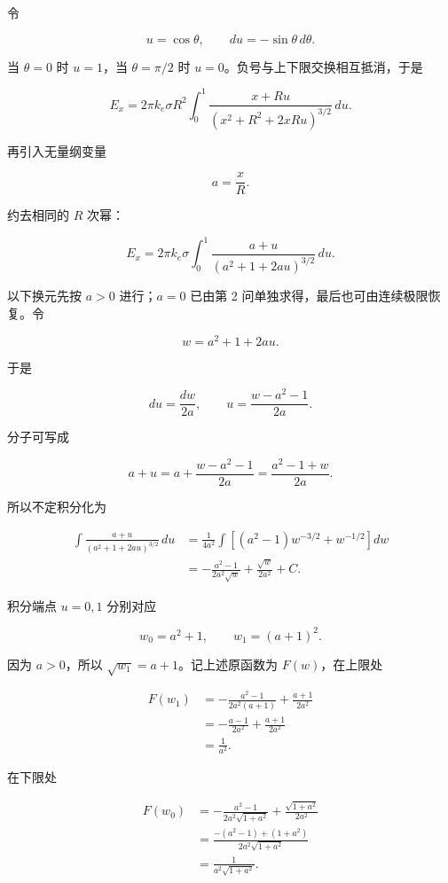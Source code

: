 \documentclass[12pt,a4paper,UTF8]{ctexart}
\begin{document}
令

\[
u=\cos\theta,
\qquad
du=-\sin\theta\,d\theta.
\]

当 \(\theta=0\) 时 \(u=1\)，当 \(\theta=\pi/2\) 时
\(u=0\)。负号与上下限交换相互抵消，于是

\[
E_x=2\pi k_e\sigma R^2
\int_0^1
\frac{x+Ru}{(x^2+R^2+2xRu)^{3/2}}\,du.
\]

再引入无量纲变量

\[
a=\frac{x}{R}.
\]

约去相同的 \(R\) 次幂：

\[
E_x=2\pi k_e\sigma
\int_0^1
\frac{a+u}{(a^2+1+2au)^{3/2}}\,du.
\]

以下换元先按 \(a>0\) 进行；\(a=0\) 已由第 2
问单独求得，最后也可由连续极限恢复。令

\[
w=a^2+1+2au.
\]

于是

\[
du=\frac{dw}{2a},
\qquad
u=\frac{w-a^2-1}{2a}.
\]

分子可写成

\[
a+u
=a+\frac{w-a^2-1}{2a}
=\frac{a^2-1+w}{2a}.
\]

所以不定积分化为

\[
\begin{aligned}
\int\frac{a+u}{(a^2+1+2au)^{3/2}}\,du
&=\frac{1}{4a^2}\int
\left[(a^2-1)w^{-3/2}+w^{-1/2}\right]dw\\
&=-\frac{a^2-1}{2a^2\sqrt w}
+\frac{\sqrt w}{2a^2}+C.
\end{aligned}
\]

积分端点 \(u=0,1\) 分别对应

\[
w_0=a^2+1,
\qquad
w_1=(a+1)^2.
\]

因为 \(a>0\)，所以 \(\sqrt{w_1}=a+1\)。记上述原函数为 \(F(w)\)，在上限处

\[
\begin{aligned}
F(w_1)
&=-\frac{a^2-1}{2a^2(a+1)}
+\frac{a+1}{2a^2}\\
&=-\frac{a-1}{2a^2}+\frac{a+1}{2a^2}\\
&=\frac{1}{a^2}.
\end{aligned}
\]

在下限处

\[
\begin{aligned}
F(w_0)
&=-\frac{a^2-1}{2a^2\sqrt{1+a^2}}
+\frac{\sqrt{1+a^2}}{2a^2}\\
&=\frac{-(a^2-1)+(1+a^2)}
{2a^2\sqrt{1+a^2}}\\
&=\frac{1}{a^2\sqrt{1+a^2}}.
\end{aligned}
\]
\end{document}
